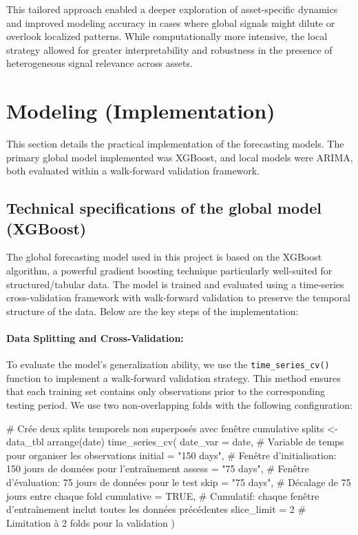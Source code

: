 \documentclass[12pt]{report}
\begin{document}
This tailored approach enabled a deeper exploration of asset-specific dynamics and improved modeling accuracy in cases where global signals might dilute or overlook localized patterns. While computationally more intensive, the local strategy allowed for greater interpretability and robustness in the presence of heterogeneous signal relevance across assets.

\newpage
\section{Modeling (Implementation)}
This section details the practical implementation of the forecasting models. The primary global model implemented was XGBoost, and local models were ARIMA, both evaluated within a walk-forward validation framework.

\subsection{Technical specifications of the global model (XGBoost)}

The global forecasting model used in this project is based on the XGBoost algorithm, a powerful gradient boosting technique particularly well-suited for structured/tabular data. The model is trained and evaluated using a time-series cross-validation framework with walk-forward validation to preserve the temporal structure of the data. Below are the key steps of the implementation:

\paragraph{Data Splitting and Cross-Validation:}
To evaluate the model's generalization ability, we use the \texttt{time\_series\_cv()} function to implement a walk-forward validation strategy. This method ensures that each training set contains only observations prior to the corresponding testing period. We use two non-overlapping folds with the following configuration:\\

\begin{code}[language=R]
# Crée deux splits temporels non superposés avec fenêtre cumulative
splits <- data_tbl %
  arrange(date) %
  time_series_cv(
    date_var   = date,        # Variable de temps pour organiser les observations
    initial    = "150 days",  # Fenêtre d'initialisation: 150 jours de données pour l'entraînement
    assess     = "75 days",   # Fenêtre d'évaluation: 75 jours de données pour le test
    skip       = "75 days",   # Décalage de 75 jours entre chaque fold
    cumulative = TRUE,        # Cumulatif: chaque fenêtre d'entraînement inclut toutes les données précédentes
    slice_limit = 2           # Limitation à 2 folds pour la validation
  )
\end{code}\\
\end{document}
